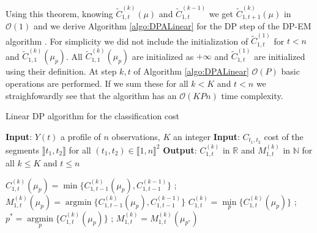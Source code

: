 \documentclass[11pt]{llncs}
\begin{document}
Using this theorem, knowing $\widetilde{C}_{1, t}^{(k)}(\mu)$ and $\widetilde{C}_{1, t}^{(k-1)}$ we get $\widetilde{C}_{1, t+1}^{(k)}(\mu)$ in $\mathcal{O}(1)$
and we derive Algorithm \ref{algo:DPALinear} for the DP step of the DP-EM algorithm \cite{picard_2007}. For simplicity we did not include the initialization of $\widetilde{C}^{(1)}_{1,t}$ for $t < n$ and $\widetilde{C}^{(k)}_{1,1}(\mu_p)$.
All $\widetilde{C}^{(k)}_{1,1}(\mu_p)$ are initialized as $+\infty$ and $\widetilde{C}^{(1)}_{1,t}$ are initialized using their definition. At step $k, t$ of Algorithm \ref{algo:DPALinear}  $\mathcal{O}(P)$ basic operations are performed. If we sum these for all $k < K$ and $t < n$  we straighfowardly see that the algorithm has an $\mathcal{O}(KPn)$ time complexity.
\begin{algorithm}
\begin{algorithmic}
\caption{Linear DP algorithm for the classification cost}\label{algo:DPALinear}
    \State \textbf{Input}: $Y(t)$ a profile of $n$ observations, $K$ an integer 
 \State \textbf{Input}: $C_{t_1,t_2}$ cost of the segments $\rrbracket t_1, t_2 \rrbracket$  for all $(t_1, t_2) \in \llbracket1, n \rrbracket^2$
   \State \textbf{Output}: $C^{(k)}_{1,t}$ in $\mathbb{R}$ and $M^{(k)}_{1,t}$ in $\mathbb{N}$ for all $k \leq K$ and $t \leq n$ 

           \State $C^{(k)}_{1,t}(\mu_p) = \min \{ C^{(k)}_{1,t-1}(\mu_p), C^{(k-1)}_{1,t-1} \}$ ; 
           \State $M^{(k)}_{1,t}(\mu_p) = \operatorname{argmin} \{C^{(k)}_{1,t-1}(\mu_p), C^{(k-1)}_{1,t-1} \}$ 
          \EndFor        
           \State $C^{(k)}_{1,t} = \underset{p}{\min} \{ C^{(k)}_{1,t}(\mu_p) \}$ ; $p^* = \underset{p}{\operatorname{argmin}} \{ C^{(k)}_{1,t}(\mu_p) \}$ ; $M^{(k)}_{1,t} = M^{(k)}_{1,t}( \mu_{{p^*}}) $ 
         \EndFor
    \EndFor
  \end{algorithmic}
\end{algorithm}
\end{document}
